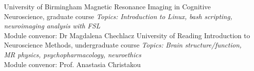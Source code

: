 {University of Birmingham}
{Magnetic Resonance Imaging in Cognitive Neuroscience, \footnotesize graduate course}
{\emph{\footnotesize Topics: Introduction to Linux, bash scripting, neuroimaging analysis with FSL}}\\
{\footnotesize Module convenor: Dr Magdalena Chechlacz}
\vspace{0.7em}
{University of Reading}
{Introduction to Neuroscience Methods, \footnotesize undergraduate course}
{\emph{\footnotesize Topics: Brain structure/function, MR physics, psychopharmacology, neuroethics}}\\
{\footnotesize Module convenor: Prof. Anastasia Christakou}